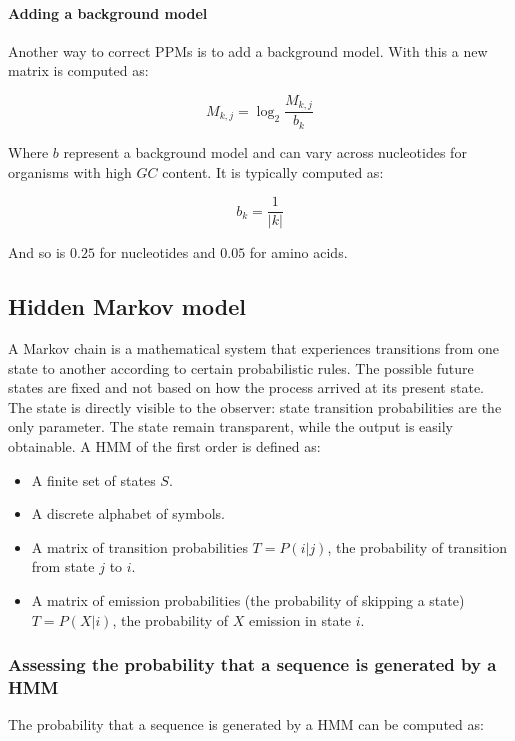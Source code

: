 			\paragraph{Adding a background model}
			Another way to correct PPMs is to add a background model.
			With this a new matrix is computed as:

			$$M_{k,j} = \log_2\frac{M_{k,j}}{b_k}$$

			Where $b$ represent a background model and can vary across nucleotides for organisms with high $GC$ content.
			It is typically computed as:

			$$b_k = \frac{1}{|k|}$$

			And so is $0.25$ for nucleotides and $0.05$ for amino acids.


	\subsection{Hidden Markov model}
	A Markov chain is a mathematical system that experiences transitions from one state to another according to certain probabilistic rules.
	The possible future states are fixed and not based on how the process arrived at its present state.
	The state is directly visible to the observer: state transition probabilities are the only parameter.
	The state remain transparent, while the output is easily obtainable.
	A HMM of the first order is defined as:

	\begin{multicols}{2}
		\begin{itemize}
			\item A finite set of states $S$.
			\item A discrete alphabet of symbols.
			\item A matrix of transition probabilities $T = P(i|j)$, the probability of transition from state $j$ to $i$.
			\item A matrix of emission probabilities (the probability of skipping a state) $T = P(X|i)$, the probability of $X$ emission in state $i$.
		\end{itemize}
	\end{multicols}

		\subsubsection{Assessing the probability that a sequence is generated by a HMM}
		The probability that a sequence is generated by a HMM can be computed as:

